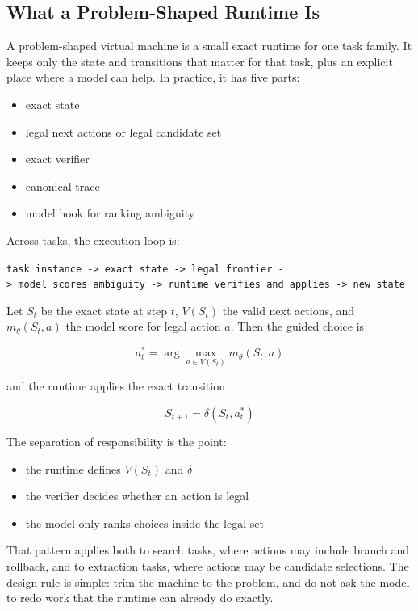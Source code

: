 \documentclass[
]{article}
\providecommand{\tightlist}{%
  \setlength{\itemsep}{0pt}\setlength{\parskip}{0pt}}
\begin{document}
\subsection{What a Problem-Shaped Runtime
Is}\label{what-a-problem-shaped-runtime-is}

A problem-shaped virtual machine is a small exact runtime for one task
family. It keeps only the state and transitions that matter for that
task, plus an explicit place where a model can help. In practice, it has
five parts:

\begin{itemize}
\tightlist
\item
  exact state
\item
  legal next actions or legal candidate set
\item
  exact verifier
\item
  canonical trace
\item
  model hook for ranking ambiguity
\end{itemize}

Across tasks, the execution loop is:

\texttt{task\ instance\ -\textgreater{}\ exact\ state\ -\textgreater{}\ legal\ frontier\ -\textgreater{}\ model\ scores\ ambiguity\ -\textgreater{}\ runtime\ verifies\ and\ applies\ -\textgreater{}\ new\ state}

Let \(S_t\) be the exact state at step \(t\), \(V(S_t)\) the valid next
actions, and \(m_\theta(S_t, a)\) the model score for legal action
\(a\). Then the guided choice is

\[
a_t^* = \arg\max_{a \in V(S_t)} m_\theta(S_t, a)
\]

and the runtime applies the exact transition

\[
S_{t+1} = \delta(S_t, a_t^*)
\]

The separation of responsibility is the point:

\begin{itemize}
\tightlist
\item
  the runtime defines \(V(S_t)\) and \(\delta\)
\item
  the verifier decides whether an action is legal
\item
  the model only ranks choices inside the legal set
\end{itemize}

That pattern applies both to search tasks, where actions may include
branch and rollback, and to extraction tasks, where actions may be
candidate selections. The design rule is simple: trim the machine to the
problem, and do not ask the model to redo work that the runtime can
already do exactly.
\end{document}
